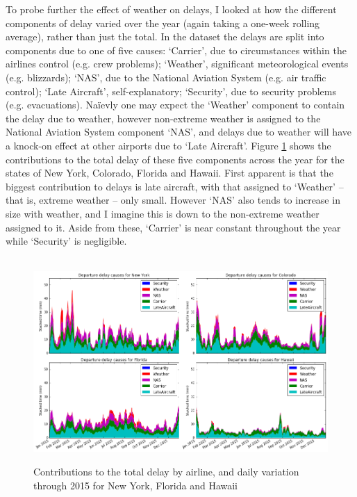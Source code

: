 \documentclass[a4paper]{article}
\begin{document}
To probe further the effect of weather on delays, I looked at how the different components of delay varied over the year (again taking a one-week rolling average), rather than just the total. In the dataset the  delays are split into components due to one of five causes:\footnotemark[12] `Carrier', due to circumstances within the airlines control (e.g. crew problems); `Weather', significant meteorological events (e.g. blizzards); `NAS', due to the National Aviation System (e.g. air traffic control); `Late Aircraft', self-explanatory; `Security', due to security problems (e.g. evacuations).  Na\"{i}evly one may expect the `Weather' component to contain the delay due to weather, however non-extreme weather is assigned to the National Aviation System component `NAS', and delays due to weather will have a knock-on effect at other airports due to `Late Aircraft'. Figure \ref{delaytypesyear} shows the contributions to the total delay of these five components across the year for the states of New York, Colorado, Florida and Hawaii. First apparent is that the biggest contribution to delays is late aircraft, with that assigned to `Weather' -- that is, extreme weather -- only small. However `NAS' also tends to increase in size with weather, and I imagine this is down to the non-extreme weather assigned to it. Aside from these, `Carrier' is near constant throughout the year while `Security' is negligible.

\begin{figure}[h]
\centering
\hbox{\hspace{-0.5in}
\includegraphics[width=1.1\textwidth]{../figures/exploration/delaytypes_year.png}}
\caption{Contributions to the total delay by airline, and daily variation through 2015 for New York, Florida and Hawaii}
\label{delaytypesyear}
\end{figure}
\end{document}
